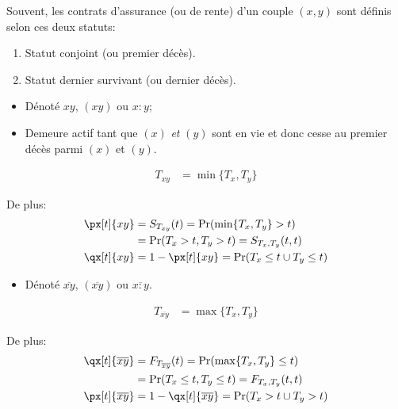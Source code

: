 \documentclass[10pt, french]{article}
\begin{document}
\begin{multicols*}{2}
Souvent, les contrats d'assurance (ou de rente) d'un couple $(x, y)$ sont définis selon ces deux statuts:
\begin{enumerate}[leftmargin = *]
	\item	Statut conjoint (ou premier décès).
	\item	Statut dernier survivant (ou dernier décès).
\end{enumerate}

\begin{definitionNOHFILLsub}
\begin{itemize}[leftmargin = *]
	\item	Dénoté $xy$, $(xy)$ ou $x : y$;
	\item	Demeure actif tant que $(x)$ \textit{et} $(y)$ sont en vie et donc cesse au premier décès parmi $(x)$ et $(y)$.
\end{itemize}
\begin{align*}
	T_{xy}
	&=	\min\{T_{x}, T_{y}\}	
\end{align*}

De plus:
\begin{align*}
	\px[t]{xy}
	&=	S_{T_{xy}}(t)
	=	\Pr(\min\{T_{x}, T_{y}\}	>	t)	\\
	&=	\Pr(T_{x} > t, T_{y}	>	t)	
	=	S_{T_{x}, T_{y}}(t, t)	\\
	\qx[t]{xy}
	&=	1 - \px[t]{xy}
	=	\Pr(T_{x} \leq t \cup T_{y}	\leq	t)	
\end{align*}
\end{definitionNOHFILLsub}

\begin{definitionNOHFILLsub}
\begin{itemize}[leftmargin = *]
	\item	Dénoté $\overline{xy}$, $(\overline{xy})$ ou $\overline{x : y}$.
\end{itemize}
\begin{align*}
	T_{\overline{xy}}
	&=	\max\{T_{x}, T_{y}\}	
\end{align*}

De plus:
\begin{align*}
	\qx[t]{\overline{xy}}
	&=	F_{T_{\overline{xy}}}(t)
	=	\Pr(\max\{T_{x}, T_{y}\}	\leq	t)	\\
	&=	\Pr(T_{x} \leq t, T_{y}	\leq	t)	
	=	F_{T_{x}, T_{y}}(t, t)	\\
	\px[t]{\overline{xy}}
	&=	1 - \qx[t]{\overline{xy}}
	=	\Pr(T_{x} > t \cup T_{y}	>	t)	
\end{align*}
\end{definitionNOHFILLsub}


\end{multicols*}
\end{document}
